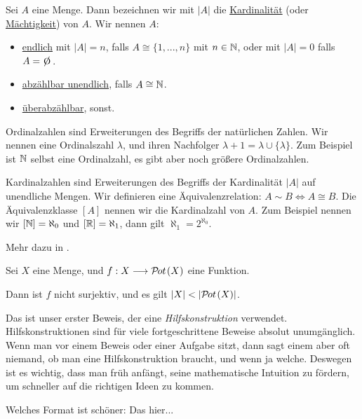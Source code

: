 \begin{definition}[Kardinalität]
    \label{def-cardinality}
    Sei $A$ eine Menge. Dann bezeichnen wir mit $|A|$ die \underline{Kardinalität} (oder \underline{Mächtigkeit}) von $A$. Wir nennen $A$:
    \begin{itemize}
        \item \underline{endlich} mit $|A| = n$, falls $A \cong \{1, ..., n\}$ mit $n \in \mathbb{N}$, oder mit $|A| = 0$ falls $A = \e$.
        \item \underline{abzählbar unendlich}, falls $A \cong \mathbb{N}$.
        \item \underline{überabzählbar}, sonst.
    \end{itemize}
\end{definition}

\begin{remark}
    Ordinalzahlen sind Erweiterungen des Begriffs der natürlichen Zahlen. Wir nennen eine Ordinalszahl $\lambda$, und ihren Nachfolger $\lambda + 1 = \lambda \cup \{\lambda\}$. Zum Beispiel ist $\mathbb{N}$ selbst eine Ordinalzahl, es gibt aber noch größere Ordinalzahlen.

    Kardinalzahlen sind Erweiterungen des Begriffs der Kardinalität $|A|$ auf unendliche Mengen. Wir definieren eine Äquivalenzrelation: $A \sim B \iff A \cong B$. Die Äquivalenzklasse $[A]$ nennen wir die Kardinalzahl von $A$. Zum Beispiel nennen wir $[\mathbb{N}] = \aleph_0$ und $[\mathbb{R}] = \aleph_1$, dann gilt $\aleph_1 = 2^{\aleph_0}$.

    Mehr dazu in \cite{GURAU}.
\end{remark}

\begin{proposition}
    \label{theorem-cantors-theorem}
    Sei $X$ eine Menge, und $f: X \longrightarrow \mathcal{P}\hspace{-1pt}ot\hspace{1pt}(X)$ eine Funktion.

    Dann ist $f$ nicht surjektiv, und es gilt $|X| < |\mathcal{P}\hspace{-1pt}ot\hspace{1pt}(X)|$.
\end{proposition}
Das ist unser erster Beweis, der eine \emph{Hilfskonstruktion} verwendet. Hilfskonstruktionen sind für viele fortgeschrittene Beweise absolut unumgänglich. Wenn man vor einem Beweis oder einer Aufgabe sitzt, dann sagt einem aber oft niemand, ob man eine Hilfskonstruktion braucht, und wenn ja welche. Deswegen ist es wichtig, dass man früh anfängt, seine mathematische Intuition zu fördern, um schneller auf die richtigen Ideen zu kommen.

\begin{query}
    Welches Format ist schöner: Das hier...
\end{query}

